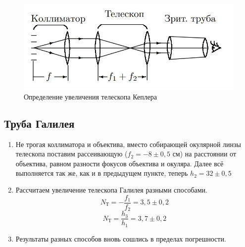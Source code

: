 \documentclass[a4paper,12pt]{article} %
\begin{document}
 \begin{figure}[h]
 \centering
 \includegraphics[scale=0.8]{lab_pic3.jpg}
		\caption{Определение увеличения телескопа Кеплера}
  \end{figure}
\subsection{Труба Галилея}
\begin{enumerate}
    \item Не трогая коллиматора и объектива, вместо собирающей окулярной линзы телескопа поставим рассеивающую ($f_{2} = -8 \pm 0,5$ см) на расстоянии от объектива, равном разности фокусов объектива и окуляра. Далее всё выполняется так же, как и в предыдущем пункте, теперь $h_2 = 32 \pm 0,5$
    \item Рассчитаем увеличение телескопа Галилея разными способами.
    \begin{equation}
    N_{\text{Т}} = -\frac{f_{1}}{f_{2}} = 3,5 \pm 0,2
\end{equation}
\begin{equation}
        N_{\text{Т}} = \frac{h_{3}}{h_{1}} = 3,7 \pm 0,2
\end{equation}
\item Результаты разных способов вновь сошлись в пределах погрешности.
\end{enumerate}
\end{document}

